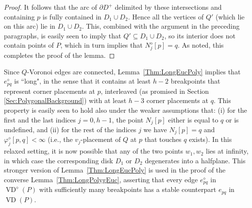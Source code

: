 \documentclass[letter,11pt]{article}
\def\poly{\diamond}
\def\Nbrs{N}
\def\VD{\mathop{\mathrm{VD}}}
\begin{document}
\begin{proof}
It follows that the arc of $\partial D^+$ delimited by these intersections and containing $p$ is fully contained in $D_1\cup D_2$.
Hence all the vertices of $Q'$ (which lie on this arc) lie in $D_1\cup D_2$. This, combined with the argument in the preceding paragraphs, is easily seen to imply that $Q'\subseteq D_1\cup D_2$, so its interior does not contain points of $P$, which in turn implies that $\Nbrs_j^\poly[p]=q$. 
As noted, this completes the proof of the lemma.
\end{proof}

Since $Q$-Voronoi edges are connected, Lemma~\ref{Thm:LongEucPoly} implies that $e_{pq}^\poly$ is ``long", in the sense that it contains at least $h-2$ breakpoints that represent corner placements at $p$, interleaved (as promised in Section \ref{Sec:PolygonalBackground}) with at least $h-3$ corner placements at $q$.
This property is easily seen to hold also under the weaker assumptions that: (i) for the first and the last indices $j=0,h-1$, the point $\Nbrs_j[p]$ either is equal to $q$ or is undefined, and (ii) for the rest of the indices $j$ we have $\Nbrs_j[p]=q$ and $\varphi^\poly_j[p,q]<\infty$ (i.e., the $v_j$-placement of $Q$ at $p$ that touches $q$ exists).
In this relaxed setting, it is now possible that any of the two points $w_1,w_2$ lies at infinity, in which case the corresponding disk $D_1$ or $D_2$ degenerates into a halfplane. This stronger version of 
Lemma~\ref{Thm:LongEucPoly} is used in the proof of the converse 
Lemma~\ref{Thm:LongPolygEuc}, asserting that every edge $e^\poly_{pq}$ in $\VD^\poly(P)$ with sufficiently many breakpoints has a stable counterpart $e_{pq}$ in $\VD(P)$.
\end{document}
